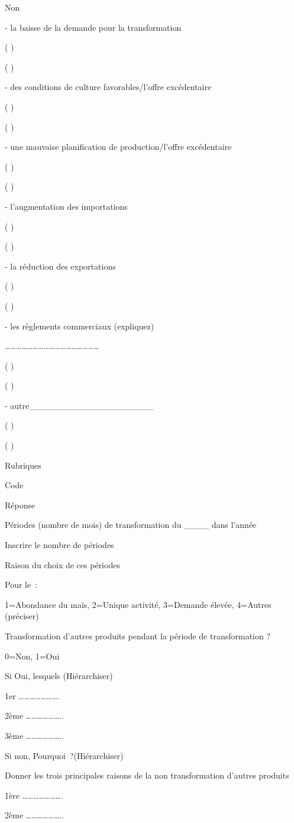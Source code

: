 \documentclass[12pt,oneside]{report}
\begin{document}
Non

- la baisse de la demande pour la transformation

( )

( )

- des conditions de culture favorables/l'offre excédentaire

( )

( )

- une mauvaise planification de production/l'offre excédentaire

( )

( )

- l'augmentation des importations

( )

( )

- la réduction des exportations

( )

( )

- les règlements commerciaux (expliquez)

……………………………………………

( )

( )

- autre\_\_\_\_\_\_\_\_\_\_\_\_\_\_\_\_\_\_\_\_

( )

( )

Rubriques

Code

Réponse

Périodes (nombre de mois) de transformation du \_\_\_\_ dans l’année

Inscrire le nombre de périodes

Raison du choix de ces périodes

Pour le :

1=Abondance du maïs, 2=Unique activité, 3=Demande élevée, 4=Autres (préciser)

Transformation d’autres produits pendant la période de transformation ?

0=Non, 1=Oui

Si Oui, lesquels (Hiérarchiser)

1er ………………….

2ème ………………..

3ème ………………..

Si non, Pourquoi ?(Hiérarchiser)

Donner les trois principales raisons de la non transformation d’autres produits

1ère ………………….

2ème ………………..
\end{document}

